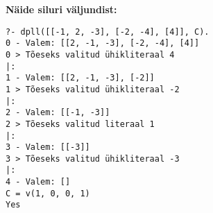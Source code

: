 \textbf{Näide siluri väljundist:}

\begin{verbatim}
?- dpll([[-1, 2, -3], [-2, -4], [4]], C).
0 - Valem: [[2, -1, -3], [-2, -4], [4]]
0 > Tõeseks valitud ühikliteraal 4
|:
1 - Valem: [[2, -1, -3], [-2]]
1 > Tõeseks valitud ühikliteraal -2
|:
2 - Valem: [[-1, -3]]
2 > Tõeseks valitud literaal 1
|:
3 - Valem: [[-3]]
3 > Tõeseks valitud ühikliteraal -3
|:
4 - Valem: []
C = v(1, 0, 0, 1)
Yes
\end{verbatim}
